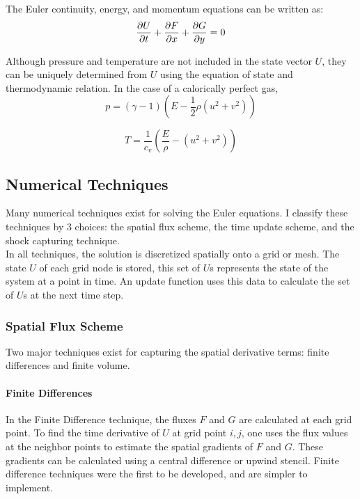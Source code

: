 \documentclass[paper=a4, fontsize=11pt]{scrartcl}
\numberwithin{equation}{section}        %
\numberwithin{figure}{section}          %
\numberwithin{table}{section}               %
\begin{document}
The Euler continuity, energy, and momentum equations can be written as:
\begin{equation}
    \pdv{U}{t} + \pdv{F}{x} + \pdv{G}{y} = 0
\end{equation}

Although pressure and temperature are not included in the state vector $U$, they can be uniquely determined from $U$ using the equation of state and thermodynamic relation. In the case of a calorically perfect gas,
\begin{equation}
    p = (\gamma - 1) \left( E - \frac{1}{2} \rho (u^2 + v^2) \right)
\end{equation}

\begin{equation}
    T = \frac{1}{c_v} \left( \frac{E}{\rho} - (u^2 + v^2) \right)
\end{equation}

\subsection{Numerical Techniques}
Many numerical techniques exist for solving the Euler equations. I classify these techniques by 3 choices: the spatial flux scheme, the time update scheme, and the shock capturing technique.\\
In all techniques, the solution is discretized spatially onto a grid or mesh. The state $U$ of each grid node is stored, this set of $U$s represents the state of the system at a point in time. An update function uses this data to calculate the set of $U$s at the next time step.

\subsubsection{Spatial Flux Scheme}
Two major techniques exist for capturing the spatial derivative terms: finite differences and finite volume.

\paragraph{Finite Differences}
In the Finite Difference technique, the fluxes $F$ and $G$ are calculated at each grid point. To find the time derivative of $U$ at grid point $i, j$, one uses the flux values at the neighbor points to estimate the spatial gradients of $F$ and $G$. These gradients can be calculated using a central difference or upwind stencil. Finite difference techniques were the first to be developed, and are simpler to implement.
\end{document}
